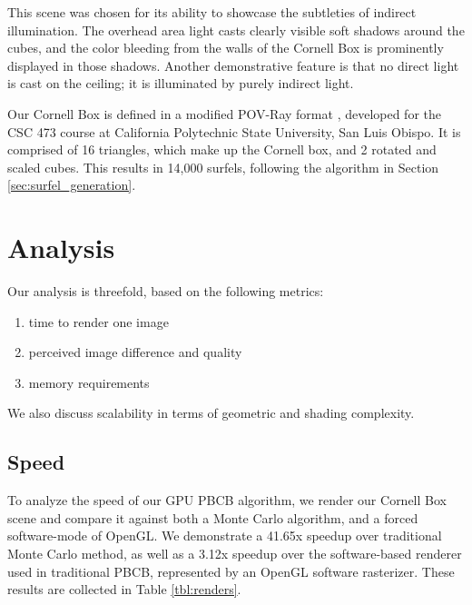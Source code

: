 This scene was chosen for its ability to showcase the subtleties of indirect illumination. The overhead area light casts clearly visible soft shadows around the cubes, and the color bleeding from the walls of the Cornell Box is prominently displayed in those shadows. Another demonstrative feature is that no direct light is cast on the ceiling; it is illuminated by purely indirect light.

Our Cornell Box is defined in a modified POV-Ray format \cite{bib:povray}, developed for the CSC 473 course at California Polytechnic State University, San Luis Obispo. It is comprised of 16 triangles, which make up the Cornell box, and 2 rotated and scaled cubes. This results in 14,000 surfels, following the algorithm in Section \ref{sec:surfel_generation}.

\section{Analysis}
\label{sec:analysis}

\noindent Our analysis is threefold, based on the following metrics:
\begin{enumerate}
\item time to render one image
\item perceived image difference and quality
\item memory requirements
\end{enumerate}
\noindent We also discuss scalability in terms of geometric and shading complexity.

\subsection{Speed}
To analyze the speed of our GPU PBCB algorithm, we render our Cornell Box scene and compare it against both a Monte Carlo algorithm, and a forced software-mode of OpenGL. We demonstrate a 41.65x speedup over traditional Monte Carlo method, as well as a 3.12x speedup over the software-based renderer used in traditional PBCB, represented by an OpenGL software rasterizer. These results are collected in Table \ref{tbl:renders}.

